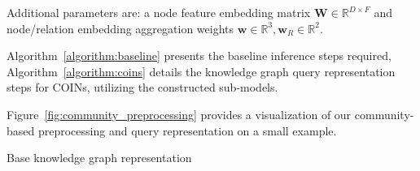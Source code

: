 Additional parameters are: a {node feature embedding matrix} $\mathbf{W} \in \mathbb{R}^{D \times F}$ and {node/relation embedding aggregation weights} $\mathbf{w} \in \mathbb{R}^{3}, \mathbf{w}_R \in \mathbb{R}^{2}$.

Algorithm~\ref{algorithm:baseline} presents the baseline inference steps required, Algorithm~\ref{algorithm:coins} details the knowledge graph query representation steps for COINs, utilizing the constructed sub-models. 

Figure~\ref{fig:community_preprocessing} provides a visualization of our community-based preprocessing and query representation on a small example. 

\begin{algorithm}[ht!]%
    \caption{Base knowledge graph representation}
    \label{algorithm:baseline}
    \begin{algorithmic}[1]
    \end{algorithmic}
\end{algorithm}
 
